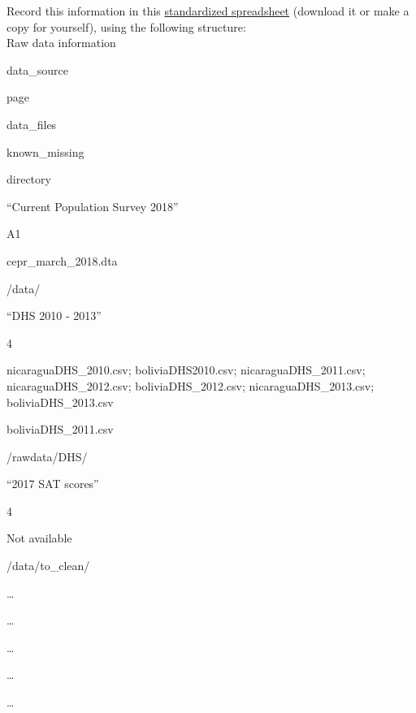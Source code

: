 \documentclass[]{book}
\begin{document}
Record this information in this \href{https://docs.google.com/spreadsheets/d/1LUIdVFH0OfR70C7z07TYeE-uWzKI_JIeWUMaYhqEKK0/edit\#gid=0\&range=A1}{standardized spreadsheet} (download it or make a copy for yourself), using the following structure:\\

\label{tab:raw-data-information}Raw data information

data\_source

page

data\_files

known\_missing

directory

``Current Population Survey 2018''

A1

cepr\_march\_2018.dta

/data/

``DHS 2010 - 2013''

4

nicaraguaDHS\_2010.csv; boliviaDHS2010.csv; nicaraguaDHS\_2011.csv; nicaraguaDHS\_2012.csv; boliviaDHS\_2012.csv; nicaraguaDHS\_2013.csv; boliviaDHS\_2013.csv

boliviaDHS\_2011.csv

/rawdata/DHS/

``2017 SAT scores''

4

Not available

/data/to\_clean/

\ldots{}

\ldots{}

\ldots{}

\ldots{}

\ldots{}
\end{document}
